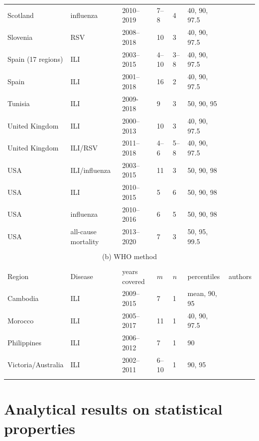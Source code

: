 \documentclass{article}
\begin{document}
\begin{table}[h!]
\begin{tabular}{l l l l l l l}
Scotland & influenza & 2010--2019 & 7--8 & 4 & 40, 90, 97.5 & \cite{Dickson2020}\\
Slovenia & RSV & 2008--2018 & 10 & 3 & 40, 90, 97.5 & \cite{Grilc2021}\\
Spain (17 regions) & ILI & 2003--2015 & 4--10 & 3--8 & 40, 90, 97.5 & \cite{Bangert2017}\\
Spain & ILI & 2001--2018 & 16 & 2 & 40, 90, 97.5 & \cite{RedondoBravo2020}\\
Tunisia & ILI & 2009-2018 & 9 & 3 & 50, 90, 95 & \cite{Bouguerra2020}\\
United Kingdom & ILI & 2000--2013 & 10 & 3 & 40, 90, 97.5 & \cite{Green2015}\\
United Kingdom & ILI/RSV & 2011--2018 & 4--6 & 5--8 & 40, 90, 97.5 & \cite{Harcourt2019}\\
USA & ILI/influenza & 2003--2015 & 11 & 3 & 50, 90, 98 & \cite{Biggerstaff2017}\\
USA & ILI & 2010--2015 & 5 & 6 & 50, 90, 98 & \cite{Dahlgren2018}\\
USA & influenza & 2010--2016 & 6 & 5 & 50, 90, 98 & \cite{Dahlgren2019}\\
USA & all-cause mortality & 2013--2020 & 7 & 3 & 50, 95, 99.5 & \cite{Dahlgren2022}\\
\bottomrule\\
\multicolumn{7}{c}{(b) WHO method}\\ \\
\toprule
Region & Disease & years covered & $m$ & $n$ & percentiles & authors\\
\midrule
Cambodia & ILI & 2009--2015 & 7 & 1 & mean, 90, 95 & \cite{Ly2017}\\
Morocco & ILI & 2005--2017 & 11 & 1 & 40, 90, 97.5 & \cite{Rguig2020}\\
Philippines & ILI & 2006--2012 & 7 & 1 & 90 & \cite{Lucero2016}\\
Victoria/Australia & ILI & 2002--2011 & 6--10 & 1 & 90, 95 & \cite{Tay2013}\\
\bottomrule\\
\end{tabular}
\end{table}



\section{Analytical results on statistical properties}
\label{sec:analytical_results}
\end{document}
